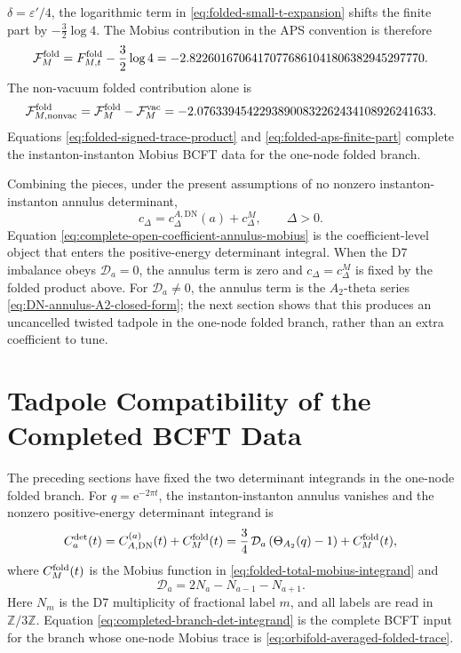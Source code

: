 \documentclass[11pt]{article}
\newcommand{\Z}{\mathbb{Z}}
\newcommand{\vac}{\mathrm{vac}}
\newcommand{\DN}{\mathrm{DN}}
\newcommand{\e}{\mathrm{e}}
\newcommand{\eps}{\varepsilon}
\begin{document}
\(\delta=\eps'/4\), the logarithmic term in \eqref{eq:folded-small-t-expansion} shifts the
finite part by \(-\frac32\log4\).  The Mobius contribution in the APS convention is therefore
\begin{equation}
  \mathcal F_M^{\rm fold}
  =
  F_{M,t}^{\rm fold}-\frac32\log4
  =
  -2.82260167064170776861041806382945297770 .
  \label{eq:folded-aps-finite-part}
\end{equation}
The non-vacuum folded contribution alone is
\begin{equation}
  \mathcal F_{M,{\rm nonvac}}^{\rm fold}
  =
  \mathcal F_M^{\rm fold}-\mathcal F_M^{\vac}
  =
  -2.07633945422938900832262434108926241633 .
  \label{eq:folded-nonvac-finite-part}
\end{equation}
Equations \eqref{eq:folded-signed-trace-product} and \eqref{eq:folded-aps-finite-part} complete
the instanton-instanton Mobius BCFT data for the one-node folded branch.

Combining the pieces, under the present assumptions of no nonzero instanton-instanton annulus
determinant,
\begin{equation}
  c_\Delta
  =
  c_\Delta^{A,\DN}(a)+c_\Delta^M,
  \qquad
  \Delta>0.
  \label{eq:complete-open-coefficient-annulus-mobius}
\end{equation}
Equation \eqref{eq:complete-open-coefficient-annulus-mobius} is the coefficient-level object that
enters the positive-energy determinant integral. When the D7 imbalance obeys
\(\mathcal D_a=0\), the annulus term is zero and \(c_\Delta=c_\Delta^M\) is fixed by the folded
product above. For \(\mathcal D_a\ne0\), the annulus term is the \(A_2\)-theta series
\eqref{eq:DN-annulus-A2-closed-form}; the next section shows that this produces an uncancelled
twisted tadpole in the one-node folded branch, rather than an extra coefficient to tune.



\section{Tadpole Compatibility of the Completed BCFT Data}

The preceding sections have fixed the two determinant integrands in the one-node folded branch.
For \(q=\e^{-2\pi t}\), the instanton-instanton annulus vanishes and the nonzero
positive-energy determinant integrand is
\begin{equation}
  C_a^{\det}(t)
  =
  C_{A,\DN}^{(a)}(t)+C_M^{\rm fold}(t)
  =
  \frac34\,\mathcal D_a\left(\Theta_{A_2}(q)-1\right)
  +
  C_M^{\rm fold}(t),
  \label{eq:completed-branch-det-integrand}
\end{equation}
where \(C_M^{\rm fold}(t)\) is the Mobius function in
\eqref{eq:folded-total-mobius-integrand} and
\begin{equation}
  \mathcal D_a=2N_a-N_{a-1}-N_{a+1}.
  \label{eq:completed-branch-Da-definition}
\end{equation}
Here \(N_m\) is the D7 multiplicity of fractional label \(m\), and all labels are read in
\(\Z/3\Z\).  Equation \eqref{eq:completed-branch-det-integrand} is the complete BCFT input for
the branch whose one-node Mobius trace is \eqref{eq:orbifold-averaged-folded-trace}.
\end{document}
